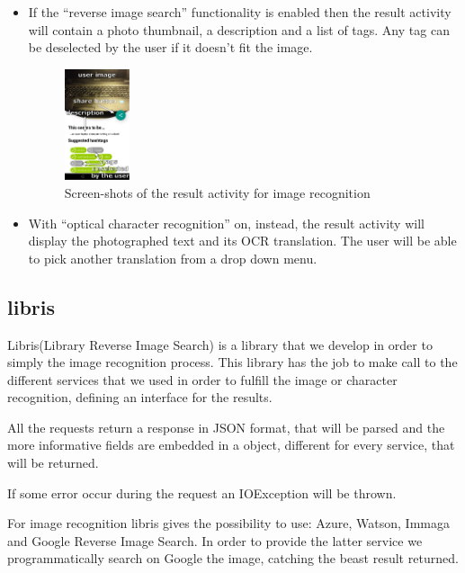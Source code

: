 \begin{itemize}
\begin{itemize}
     \item If the ``reverse image search'' functionality is enabled then the
           result activity will contain a photo thumbnail, a description and a list of
           tags. Any tag can be deselected by the user if it doesn't fit the image.
    \begin{figure}[h]
        \centering
        \includegraphics[width=0.18\textwidth]{../img/image_result_activity}
        \caption{Screen-shots of the result activity for image recognition}
        \label{fig:imageResultActivity}
    \end{figure}
     \item With ``optical character recognition'' on, instead, the result
           activity will display the photographed text and its OCR translation. The user
           will be able to pick another translation from a drop down menu.
    \end{itemize}
\end{itemize}

\subsection{libris}
Libris(Library Reverse Image Search) is a library that we develop in order to 
simply the image recognition process. This library has the job to make call to 
the different services that we used in order to fulfill the image or character 
recognition, defining an interface for the results.

All the requests return a response in JSON format, that will be parsed and the 
more informative fields are embedded in a object, different for every service, 
that will be returned. 

If some error occur during the request an IOException will be thrown.

For image recognition libris gives the possibility to use: Azure, Watson, Immaga 
and Google Reverse Image Search. In order to provide the latter service we 
programmatically search on Google the image, catching the beast result returned.

